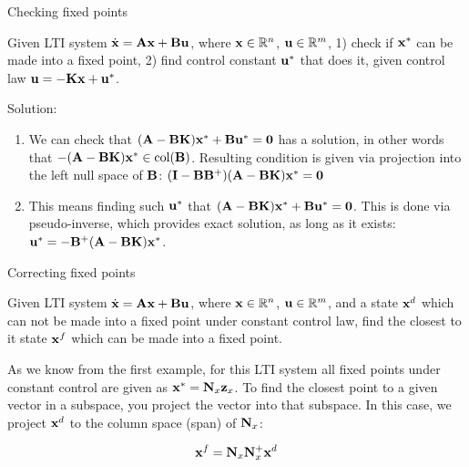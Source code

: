 \documentclass{beamer}
\begin{document}
\begin{frame}{Checking fixed points}
\begin{flushleft}

Given LTI system $\dot{\mathbf{x}} = \mathbf{A} \mathbf{x} + \mathbf{B} \mathbf{u}$, where $\mathbf{x} \in \mathbb{R}^n$, $\mathbf{u} \in \mathbb{R}^m$, 1) check if $\mathbf{x}^*$ can be made into a fixed point, 2) find control constant $\mathbf{u}^*$ that does it, given control law $\mathbf{u} = -\mathbf{K}\mathbf{x} + \mathbf{u}^*$.

\bigskip

Solution: 

\begin{enumerate}
    \item We can check that $(\mathbf{A}-\mathbf{B}\mathbf{K}) \mathbf{x}^* + \mathbf{B} \mathbf{u}^* = \mathbf{0}$ has a solution, in other words that $-(\mathbf{A}-\mathbf{B}\mathbf{K}) \mathbf{x}^* \in \text{col}(\mathbf{B})$. Resulting condition is given via projection into the left null space of $\mathbf{B}$: $(\mathbf{I} - \mathbf{B}\mathbf{B}^+)(\mathbf{A}-\mathbf{B}\mathbf{K})\mathbf{x}^* = \mathbf{0}$
    \item This means finding such $\mathbf{u}^*$ that $(\mathbf{A}-\mathbf{B}\mathbf{K}) \mathbf{x}^* + \mathbf{B}\mathbf{u}^*= \mathbf{0}$. This is done via pseudo-inverse, which provides exact solution, as long as it exists: $\mathbf{u}^*= -\mathbf{B}^+(\mathbf{A}-\mathbf{B}\mathbf{K}) \mathbf{x}^*$.
\end{enumerate}

\end{flushleft}
\end{frame}




\begin{frame}{Correcting fixed points}
\begin{flushleft}

Given LTI system $\dot{\mathbf{x}} = \mathbf{A} \mathbf{x} + \mathbf{B} \mathbf{u}$, where $\mathbf{x} \in \mathbb{R}^n$, $\mathbf{u} \in \mathbb{R}^m$, and a state $\mathbf{x}^d$ which can not be made into a fixed point under constant control law, find the closest to it state $\mathbf{x}^f$ which can be made into a fixed point.

\bigskip

As we know from the first example, for this LTI system all fixed points under constant control are given as $\mathbf{x}^* = \mathbf{N}_x \mathbf{z}_x$. To find the closest point to a given vector in a subspace, you project the vector into that subspace. In this case, we project $\mathbf{x}^d$ to the column space (span) of $\mathbf{N}_x$:

\begin{equation}
    \mathbf{x}^f = \mathbf{N}_x\mathbf{N}_x^+ \mathbf{x}^d
\end{equation}

\end{flushleft}
\end{frame}
\end{document}
